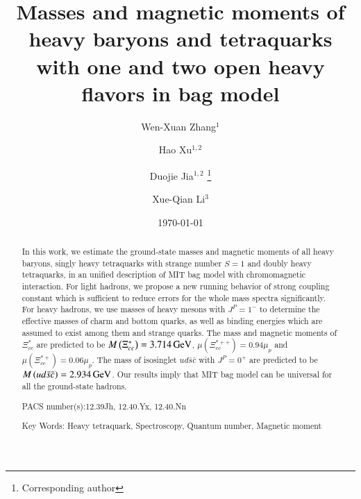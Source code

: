 \documentclass[prd,twocolumn,floatfix,nofootinbib]{revtex4}
\begin{document}
\title{Masses and magnetic moments of heavy baryons and tetraquarks with one and two open heavy flavors in bag model}

\author{Wen-Xuan Zhang$^{1}$}
\author{Hao Xu$^{1,2}$}
\author{Duojie Jia$^{1,2}$
\footnote{Corresponding author}} 
\author{Xue-Qian Li$^{3}$}



\begin{abstract}
In this work, we estimate the ground-state masses and magnetic moments of all heavy baryons, singly heavy tetraquarks with strange number $S=1$ and doubly heavy tetraquarks, in an unified description of MIT bag model with chromomagnetic interaction.
For light hadrons, we propose a new running behavior of strong coupling constant which is sufficient to reduce errors for the whole mass spectra significantly.
For heavy hadrons, we use masses of heavy mesons with $J^{P}=1^{-}$ to determine the effective masses of charm and bottom quarks, as well as binding energies which are assumed to exist among them and strange quarks.
The mass and magnetic moments of $\Xi_{cc}^{\ast}$ are predicted to be $M\left(\Xi_{cc}^{\ast}\right)=3.714\,{\rm GeV}$, $\mu\left(\Xi_{cc}^{\ast ++}\right)=0.94\mu_{p}$ and $\mu\left(\Xi_{cc}^{\ast +}\right)=0.06\mu_{p}$.
The mass of isosinglet $ud\bar{s}\bar{c}$ with $J^{P}=0^{+}$ are predicted to be $M\left(ud\bar{s}\bar{c}\right)=2.934\,{\rm GeV}$.
Our results imply that MIT bag model can be universal for all the ground-state hadrons.

{\normalsize PACS number(s):12.39Jh, 12.40.Yx, 12.40.Nn}

{\normalsize Key Words: Heavy tetraquark, Spectroscopy, Quantum number, Magnetic moment}
\end{abstract}
\maketitle
\date{\today}
\end{document}
